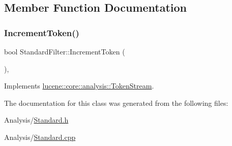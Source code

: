 \subsection{Member Function Documentation}
\mbox{\label{classlucene_1_1core_1_1analysis_1_1standard_1_1StandardFilter_a11958d89cb4aed281d083db7be0e8680}} 
\subsubsection{\texorpdfstring{Increment\+Token()}{IncrementToken()}}
{\footnotesize\ttfamily bool Standard\+Filter\+::\+Increment\+Token (\begin{DoxyParamCaption}{ }\end{DoxyParamCaption})\hspace{0.3cm}{\ttfamily [override]}, {\ttfamily [virtual]}}



Implements \mbox{\hyperlink{classlucene_1_1core_1_1analysis_1_1TokenStream_a614d4ea24a354d6f4354b4941b5124e2}{lucene\+::core\+::analysis\+::\+Token\+Stream}}.



The documentation for this class was generated from the following files\+:\begin{DoxyCompactItemize}
\item 
Analysis/\mbox{\hyperlink{Standard_8h}{Standard.\+h}}\item 
Analysis/\mbox{\hyperlink{Standard_8cpp}{Standard.\+cpp}}\end{DoxyCompactItemize}

